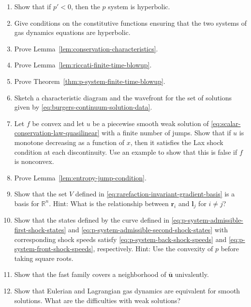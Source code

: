 \begin{enumerate}[label=\thesection.\arabic*.,ref=\thesection.\arabic*,start=1,series=book-problems]

\item\label{ex:p-system-hyperbolicity} Show that if $p'<0$, then the $p$ system is hyperbolic.

\item\label{ex:gas-dynamics-hyperbolicity} Give conditions on the constitutive functions ensuring that the two systems of gas dynamics equations are hyperbolic.

\item\label{ex:conservation-characteristics-proof} Prove Lemma~\ref{lem:conservation-characteristics}.

\item\label{ex:riccati-blowup-proof} Prove Lemma~\ref{lem:riccati-finite-time-blowup}.

\item\label{ex:p-system-blowup-proof} Prove Theorem~\ref{thm:p-system-finite-time-blowup}.

\item\label{ex:sketch-mixed-rarefaction-shock} Sketch a characteristic diagram and the wavefront for the set of solutions given by \eqref{eq:burgers-continuum-solution-data}.

\item\label{ex:convexity-lax-scalar-shock} Let $f$ be convex and let $u$ be a piecewise smooth weak solution of \eqref{eq:scalar-conservation-law-quasilinear} with a finite number of jumps. Show that if $u$ is monotone decreasing as a function of $x$, then it satisfies the Lax shock condition at each discontinuity. Use an example to show that this is false if $f$ is nonconvex.

\item\label{ex:entropy-jump-condition-proof} Prove Lemma~\ref{lem:entropy-jump-condition}.

\item\label{ex:riemann-invariant-gradient-basis} Show that the set $V$ defined in \eqref{eq:rarefaction-invariant-gradient-basis} is a basis for $\mathbb{R}^n$. Hint: What is the relationship between $\bm{r}_i$ and $\bm{l}_j$ for $i\ne j$?

\item\label{ex:p-system-shock-reparametrization} Show that the states defined by the curve defined in \eqref{eq:p-system-admissible-first-shock-states} and \eqref{eq:p-system-admissible-second-shock-states} with corresponding shock speeds satisfy \eqref{eq:p-system-back-shock-speeds} and \eqref{eq:p-system-front-shock-speeds}, respectively. Hint: Use the convexity of $p$ before taking square roots.

\item\label{ex:p-system-fast-family-covering} Show that the fast family covers a neighborhood of $\bar{\bm{u}}$ univalently.

\item\label{ex:eulerian-lagrangian-gas-equivalence} Show that Eulerian and Lagrangian gas dynamics are equivalent for smooth solutions. What are the difficulties with weak solutions?

\end{enumerate}
